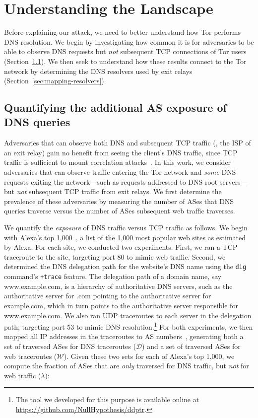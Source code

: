 \section{Understanding the Landscape}
\label{sec:landscape}

Before explaining our attack, we need to better understand how Tor performs DNS
resolution.  We begin by investigating how common it is for adversaries
to be able to observe DNS requests but \emph{not} subsequent TCP connections of
Tor users (Section~\ref{sec:as-exposure}).  We then seek to understand how
these results connect to the Tor network by determining the DNS resolvers used
by exit relays (Section~\ref{sec:mapping-resolvers}).

\subsection{Quantifying the additional AS exposure of DNS queries}
\label{sec:as-exposure}

Adversaries that can observe both DNS and subsequent TCP traffic (\eg, the ISP
of an exit relay) gain no benefit from seeing the client's DNS traffic,
since TCP traffic is sufficient to mount correlation
attacks~\cite{Murdoch2007a}.  In this work, we consider
adversaries that can observe traffic entering the Tor network and \emph{some}
DNS requests exiting the network---such as requests addressed to DNS
root servers---but {\em not} subsequent TCP traffic from exit relays.
We first determine the prevalence of these adversaries by measuring the
number of ASes that DNS queries traverse versus the
number of ASes subsequent web traffic traverses.

We quantify the {\em exposure} of DNS traffic versus TCP traffic as follows.  We
begin with Alexa's top 1,000~\cite{alexatop1k}, a list of the 1,000 most popular
web sites as estimated by Alexa.  For each site, we conducted two
experiments.  First, we ran a TCP traceroute to the site, targeting port 80 to
mimic web traffic.  Second, we determined the DNS delegation path for the
website's DNS name using the {\tt dig} command's \texttt{+trace} feature.  The
delegation path of a domain name, say www.example.com, is a hierarchy of
authoritative DNS servers, such as the authoritative server for .com
pointing to the authoritative server for example.com, which in turn points
to the authoritative server responsible for www.example.com.  We also ran
UDP traceroutes to each server in the delegation path, targeting port 53 to
mimic DNS resolution.\footnote{The tool we developed for this purpose is
available online at \url{https://github.com/NullHypothesis/ddptr}.}
For both experiments, we then mapped all IP addresses in the traceroutes to AS
numbers~\cite{ipasn}, generating both a set of traversed ASes for DNS traceroutes
($\mathcal{D}$) and a set of traversed ASes for web traceroutes
($\mathcal{W}$).  Given these two sets for each of Alexa's top
1,000, we compute the fraction of ASes that are \emph{only}
traversed for DNS traffic, but \emph{not} for web traffic ($\lambda$):

